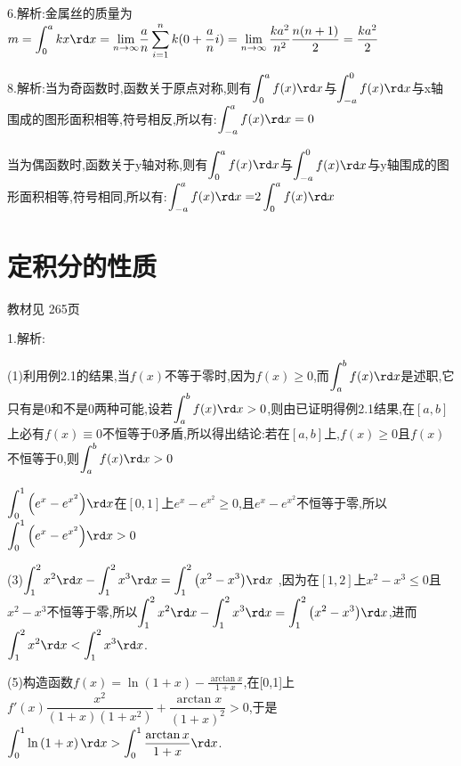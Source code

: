 6.解析:金属丝的质量为$m = \displaystyle\int_0^a {kx\rd x = \mathop {\lim }\limits_{n \to \infty } } \frac{a}{n}\sum\limits_{i = 1}^n {k(0 + \frac{a}{n}} i) = \mathop {\lim }\limits_{n \to \infty } \frac{{k{a^2}}}{{{n^2}}}\frac{{n(n + 1)}}{2} = \frac{{k{a^2}}}{2}$

8.解析:当为奇函数时,函数关于原点对称,则有$\displaystyle\int_0^a {f(x)\rd x} $与$\displaystyle\int_{ - a}^0 {f(x)\rd x} $与x轴围成的图形面积相等,符号相反,所以有:$\displaystyle\int_{ - a}^a {f(x)\rd x = 0} $

当为偶函数时,函数关于y轴对称,则有$\displaystyle\int_0^a {f(x)\rd x} $与$\displaystyle\int_{ - a}^0 {f(x)\rd x} $与y轴围成的图形面积相等,符号相同,所以有:$\displaystyle\int_{ - a}^a {f(x)\rd x = } 2\displaystyle\int_0^a {f(x)\rd x} $


\section{定积分的性质}
\begin{flushright}
  \color{zhanqing!80}
  \color{zhanqing!80}
   教材见 265页 %
\end{flushright}
1.解析:

(1)利用例2.1的结果,当$f(x)$不等于零时,因为$f\left( x \right) \geqslant 0$,而$\displaystyle\int_a^b {f(x)\rd x} $是述职,它只有是0和不是0两种可能,设若$\displaystyle\int_a^b {f(x)\rd x} > 0$,则由已证明得例2.1结果,在$[a,b]$上必有$f\left( x \right) \equiv 0$不恒等于0矛盾,所以得出结论:若在$[a,b]$上,$f\left( x \right) \geqslant 0$且$f(x)$不恒等于0,则$\displaystyle\int_a^b {f(x)\rd x}  > 0$

$\displaystyle\int_0^1 {\left( {{e^x} - {e^{{x^2}}}} \right)} \rd x$在$[0,1]$上${e^x} - {e^{{x^2}}} \geqslant 0$,且${e^x} - {e^{{x^2}}} $不恒等于零,所以$\displaystyle\int_0^1 {\left( {{e^x} - {e^{{x^2}}}} \right)} \rd x > 0$

(3)$\displaystyle\int_1^2 {{x^2}} \rd x - \displaystyle\int_1^2 {{x^3}} \rd x = \displaystyle\int_1^2 {\left( {{x^2} - {x^3}} \right)} \rd x$ ,因为在$[1,2]$上${x^2} - {x^3} \leqslant 0$且${x^2} - {x^3}$不恒等于零,所以$\displaystyle\int_1^2 {{x^2}} \rd x - \displaystyle\int_1^2 {{x^3}} \rd x = \displaystyle\int_1^2 {\left( {{x^2} - {x^3}} \right)} \rd x$,进而$\displaystyle\int_1^2 {{x^2}} \rd x < \displaystyle\int_1^2 {{x^3}} \rd x$.

(5)构造函数$f\left( x \right) = \ln \left( {1 + x} \right) - \frac{{\arctan x}}{{1 + x}}$,在[0,1]上$f'\left( x \right)\dfrac{{{x^2}}}{{\left( {1 + x} \right)\left( {1 + {x^2}} \right)}} + \dfrac{{\arctan x}}{{{{\left( {1 + x} \right)}^2}}} > 0$,于是$\displaystyle\int_0^1 {\ln \left( {1 + x} \right)\rd x}  > \displaystyle\int_0^1 {\dfrac{{\arctan x}}{{1 + x}}\rd x} $.

